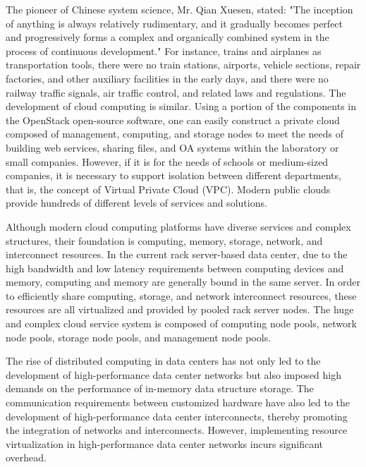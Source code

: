 The pioneer of Chinese system science, Mr. Qian Xuesen, stated: "The inception of anything is always relatively rudimentary, and it gradually becomes perfect and progressively forms a complex and organically combined system in the process of continuous development." \cite{qianxuesen}
For instance, trains and airplanes as transportation tools, there were no train stations, airports, vehicle sections, repair factories, and other auxiliary facilities in the early days, and there were no railway traffic signals, air traffic control, and related laws and regulations.
The development of cloud computing is similar.
Using a portion of the components in the OpenStack \cite{sefraoui2012openstack} open-source software, one can easily construct a private cloud composed of management, computing, and storage nodes to meet the needs of building web services, sharing files, and OA systems within the laboratory or small companies.
However, if it is for the needs of schools or medium-sized companies, it is necessary to support isolation between different departments, that is, the concept of Virtual Private Cloud (VPC).
Modern public clouds provide hundreds of different levels of services and solutions.

Although modern cloud computing platforms have diverse services and complex structures, their foundation is computing, memory, storage, network, and interconnect resources.
In the current rack server-based data center, due to the high bandwidth and low latency requirements between computing devices and memory, computing and memory are generally bound in the same server.
In order to efficiently share computing, storage, and network interconnect resources, these resources are all virtualized and provided by pooled rack server nodes.
The huge and complex cloud service system is composed of computing node pools, network node pools, storage node pools, and management node pools.

The rise of distributed computing in data centers has not only led to the development of high-performance data center networks but also imposed high demands on the performance of in-memory data structure storage. The communication requirements between customized hardware have also led to the development of high-performance data center interconnects, thereby promoting the integration of networks and interconnects. However, implementing resource virtualization in high-performance data center networks incurs significant overhead. 

